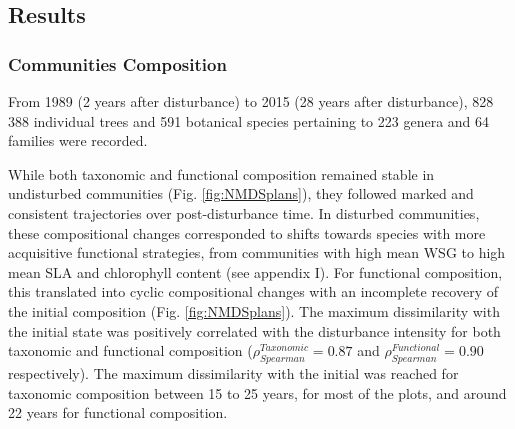 \documentclass[
  11pt,
  french,
  A4paper,
  extrafontsizes,onecolumn,openright
  ]{memoir}
\begin{document}
\subsection{Results}\label{results-1}

\subsubsection{Communities Composition}\label{communities-composition}

From 1989 (2 years after disturbance) to 2015 (28 years after
disturbance), 828 388 individual trees and 591 botanical species
pertaining to 223 genera and 64 families were recorded.

While both taxonomic and functional composition remained stable in
undisturbed communities (Fig. \ref{fig:NMDSplans}), they followed marked
and consistent trajectories over post-\break disturbance time. In
disturbed communities, these compositional changes corresponded to
shifts towards species with more acquisitive functional strategies, from
communities with high mean WSG to high mean SLA and chlorophyll content
(see appendix I). For functional composition, this translated into
cyclic compositional changes with an incomplete recovery of the initial
composition (Fig. \ref{fig:NMDSplans}). The maximum dissimilarity with
the initial state was positively correlated with the disturbance
intensity for both taxonomic and functional composition
(\(\rho_{Spearman}^{Taxonomic}=0.87\) and
\(\rho_{Spearman}^{Functional}=0.90\) respectively). The maximum
dissimilarity with the initial was reached for taxonomic composition
between 15 to 25 years, for most of the plots, and around 22 years for
functional composition.
\end{document}
